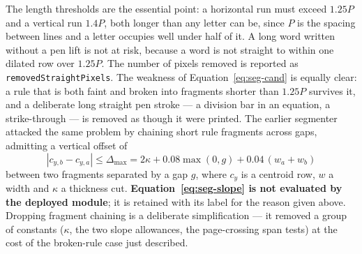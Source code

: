 The length thresholds are the essential point: a horizontal run must exceed $1.25P$ and a vertical run $1.4P$, both longer than any letter can be, since $P$ is the spacing between lines and a letter occupies well under half of it.
A long word written without a pen lift is not at risk, because a word is not straight to within one dilated row over $1.25P$.
The number of pixels removed is reported as \texttt{removedStraightPixels}.
The weakness of Equation~\ref{eq:seg-cand} is equally clear: a rule that is both faint and broken into fragments shorter than $1.25P$ survives it, and a deliberate long straight pen stroke --- a division bar in an equation, a strike-through --- is removed as though it were printed.
The earlier segmenter attacked the same problem by chaining short rule fragments across gaps, admitting a vertical offset of
\begin{equation}
|c_{y,b}-c_{y,a}|\le\Delta_{\max}=2\kappa+0.08\max(0,g)+0.04\,(w_a+w_b)
\label{eq:seg-slope}
\end{equation}
between two fragments separated by a gap $g$, where $c_y$ is a centroid row, $w$ a width and $\kappa$ a thickness cut.
\textbf{Equation~\ref{eq:seg-slope} is not evaluated by the deployed module}; it is retained with its label for the reason given above.
Dropping fragment chaining is a deliberate simplification --- it removed a group of constants ($\kappa$, the two slope allowances, the page-crossing span tests) at the cost of the broken-rule case just described.

